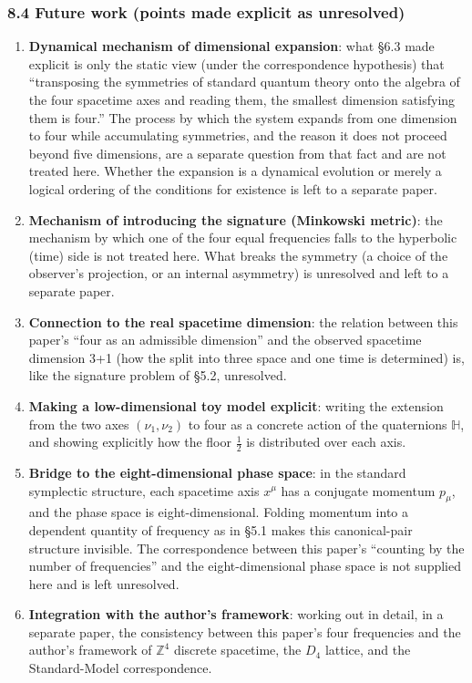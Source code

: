 \documentclass[
]{article}
\providecommand{\tightlist}{%
  \setlength{\itemsep}{0pt}\setlength{\parskip}{0pt}}
\begin{document}
\subsubsection{8.4 Future work (points made explicit as
unresolved)}\label{future-work-points-made-explicit-as-unresolved}

\begin{enumerate}
\def\labelenumi{\arabic{enumi}.}
\tightlist
\item
  \textbf{Dynamical mechanism of dimensional expansion}: what §6.3 made
  explicit is only the static view (under the correspondence hypothesis)
  that ``transposing the symmetries of standard quantum theory onto the
  algebra of the four spacetime axes and reading them, the smallest
  dimension satisfying them is four.'' The process by which the system
  expands from one dimension to four while accumulating symmetries, and
  the reason it does not proceed beyond five dimensions, are a separate
  question from that fact and are not treated here. Whether the
  expansion is a dynamical evolution or merely a logical ordering of the
  conditions for existence is left to a separate paper.
\item
  \textbf{Mechanism of introducing the signature (Minkowski metric)}:
  the mechanism by which one of the four equal frequencies falls to the
  hyperbolic (time) side is not treated here. What breaks the symmetry
  (a choice of the observer's projection, or an internal asymmetry) is
  unresolved and left to a separate paper.
\item
  \textbf{Connection to the real spacetime dimension}: the relation
  between this paper's ``four as an admissible dimension'' and the
  observed spacetime dimension 3+1 (how the split into three space and
  one time is determined) is, like the signature problem of §5.2,
  unresolved.
\item
  \textbf{Making a low-dimensional toy model explicit}: writing the
  extension from the two axes \((\nu_1,\nu_2)\) to four as a concrete
  action of the quaternions \(\mathbb{H}\), and showing explicitly how
  the floor \(\tfrac12\) is distributed over each axis.
\item
  \textbf{Bridge to the eight-dimensional phase space}: in the standard
  symplectic structure, each spacetime axis \(x^\mu\) has a conjugate
  momentum \(p_\mu\), and the phase space is eight-dimensional. Folding
  momentum into a dependent quantity of frequency as in §5.1 makes this
  canonical-pair structure invisible. The correspondence between this
  paper's ``counting by the number of frequencies'' and the
  eight-dimensional phase space is not supplied here and is left
  unresolved.
\item
  \textbf{Integration with the author's framework}: working out in
  detail, in a separate paper, the consistency between this paper's four
  frequencies and the author's framework of \(\mathbb{Z}^4\) discrete
  spacetime, the \(D_4\) lattice, and the Standard-Model correspondence.
\end{enumerate}
\end{document}
